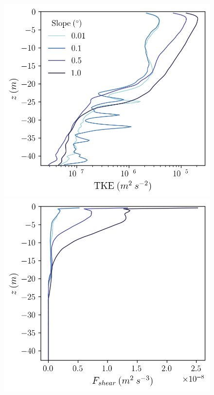 \documentclass[draft]{agujournal2019}
\begin{document}
\begin{figure}
    \centering
    \begin{minipage}{0.5\textwidth}
        \includegraphics[trim={0 0 0 0},clip, width=\textwidth]{Figures/eres_cmp_dslope_43h_tav13h_z_profile.png}
    \end{minipage}%
    \begin{minipage}{0.5\textwidth}
        \includegraphics[trim={0 0 0 0},clip,width=\textwidth]{Figures/Fshear_cmp_dslope_43h_tav13h_z_profile.png}    

\end{minipage}
\end{figure}
\end{document}
